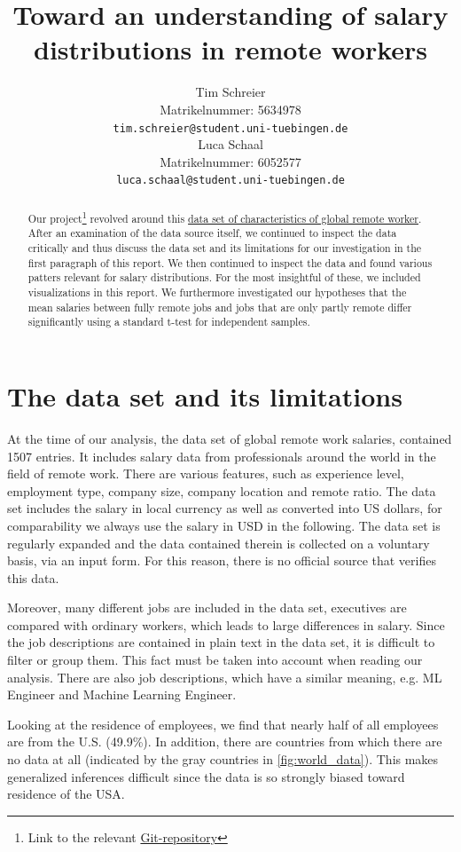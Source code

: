\documentclass{article}
\title{Toward an understanding of salary distributions in remote workers}
\author{%
  Tim Schreier\\
  Matrikelnummer: 5634978\\
  \texttt{tim.schreier@student.uni-tuebingen.de} \\
  \And
  Luca Schaal\\
  Matrikelnummer: 6052577\\
  \texttt{luca.schaal@student.uni-tuebingen.de} \\
}
\begin{document}
\maketitle

\begin{abstract}
Our project\footnote{Link to the relevant  \href{https://github.com/Lucahalt/Data-Literacy-Final-Project
}{Git-repository}}
revolved around this  \href{https://salaries.freshremote.work/download/}{data set of characteristics of global remote worker}. 
After an examination of the data source itself, we continued to inspect the data critically and thus discuss the data set and its limitations for our investigation in the first paragraph of this report. 
We then continued to inspect the data and found various patters relevant for salary distributions. For the most insightful of these, we included visualizations in this report.
We furthermore investigated our hypotheses that the mean salaries between fully remote jobs and jobs that are only partly remote differ significantly using a standard t-test for independent samples.

\end{abstract}
\section{The data set and its limitations}
\label{sec:dataset}
At the time of our analysis, the data set of global remote work salaries, contained 1507 entries. It includes salary data from professionals around the world in the field of remote work. There are various features, such as experience level, employment type, company size, company location and remote ratio. The data set includes the salary in local currency as well as converted into US dollars, for comparability we always use the salary in USD in the following. The data set is regularly expanded and the data contained therein is collected on a voluntary basis, via an input form. For this reason, there is no official source that verifies this data. 

Moreover, many different jobs are included in the data set, executives are compared with ordinary workers, which leads to large differences in salary. Since the job descriptions are contained in plain text in the data set, it is difficult to filter or group them. This fact must be taken into account when reading our analysis. There are also job descriptions, which have a similar meaning, e.g. ML Engineer and Machine Learning Engineer. 

Looking at the residence of employees, we find that nearly half of all employees are from the U.S. (49.9\%). In addition, there are countries from which there are no data at all (indicated by the gray countries in \autoref{fig:world_data}). This makes generalized inferences difficult since the data is so strongly biased toward residence of the USA.
\end{document}
